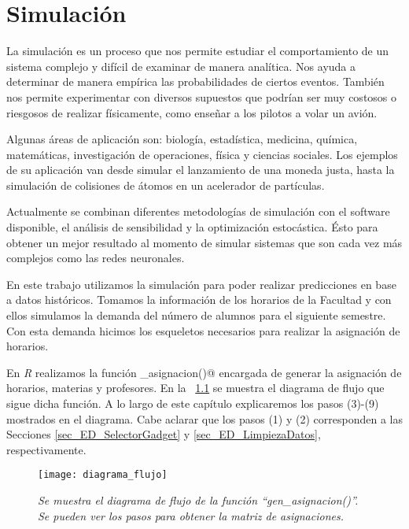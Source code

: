 \chapter{Simulación}

La simulación es un proceso que nos permite estudiar el comportamiento de un sistema complejo y difícil de examinar de manera analítica. Nos ayuda a determinar de manera empírica las probabilidades de ciertos eventos. También nos permite experimentar con diversos supuestos que podrían ser muy costosos o riesgosos de realizar físicamente, como enseñar a los pilotos a volar un avión.

Algunas áreas de aplicación son: biología, estadística, medicina, química, matemáticas, investigación de operaciones, física y ciencias sociales. Los ejemplos de su aplicación van desde simular el lanzamiento de una moneda justa, hasta la simulación de colisiones de átomos en un acelerador de partículas.

Actualmente se combinan diferentes metodologías de simulación con el software disponible, el análisis de sensibilidad y la optimización estocástica. Ésto para obtener un mejor resultado al momento de simular sistemas que son cada vez más complejos como las redes neuronales.

En este trabajo utilizamos la simulación para poder realizar predicciones en base a datos históricos. Tomamos la información de los horarios de la Facultad y con ellos simulamos la demanda del número de alumnos para el siguiente semestre. Con esta demanda hicimos los esqueletos necesarios para realizar la asignación de horarios.

En \textit{R} realizamos la función \verb@gen_asignacion()@ encargada de generar la asignación de horarios, materias y profesores. En la \figurename{~\ref{DF_genAsig}} se muestra el diagrama de flujo que sigue dicha función. A lo largo de este capítulo explicaremos los pasos (3)-(9) mostrados en el diagrama. Cabe aclarar que los pasos (1) y (2) corresponden a las Secciones \ref{sec_ED_SelectorGadget} y \ref{sec_ED_LimpiezaDatos}, respectivamente.

\begin{figure}[H]
\centering
\texttt{[image: diagrama\_flujo]} %
\caption[\textit{Diagrama de flujo de la función ``gen\_asignacion()''}]{\textit{Se muestra el diagrama de flujo de la función ``gen\_asignacion()''. Se pueden ver los pasos para obtener la matriz de asignaciones.}}\label{DF_genAsig}
\end{figure}


